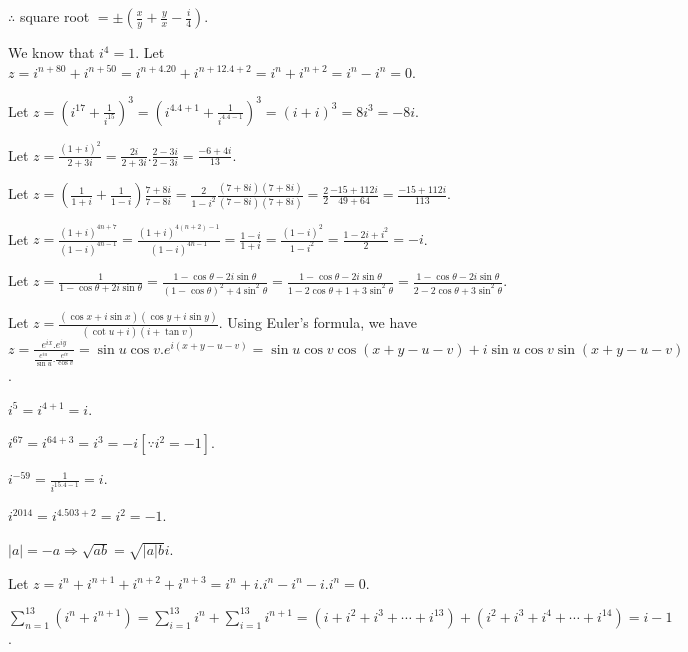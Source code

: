   $\therefore$ square root $=\pm\left(\frac{x}{y} + \frac{y}{x} - \frac{i}{4}\right)$.
\item We know that $i^4 = 1$. Let $z = i^{n + 80} + i^{n + 50} = i^{n + 4.20} + i^{n + 12.4 + 2} = i^n +
  i^{n + 2} = i^n - i^n = 0$.
\item Let $z = \left(i^{17} + \frac{1}{i^{15}}\right)^3 = \left(i^{4.4 + 1} + \frac{1}{i^{4.4 - 1}}\right)^3
  = (i + i)^3 = 8i^3 = -8i$.
\item Let $z = \frac{(1 + i)^2}{2 + 3i} = \frac{2i}{2 + 3i}.\frac{2 - 3i}{2 - 3i} = \frac{-6 + 4i}{13}$.
\item Let $z = \left(\frac{1}{1 + i} + \frac{1}{1 - i}\right)\frac{7 + 8i}{7 - 8i} = \frac{2}{1 - i^2}\frac{(7 +
  8i)(7 + 8i)}{(7 - 8i)(7 + 8i)} = \frac{2}{2}\frac{-15 + 112i}{49 + 64} = \frac{-15 + 112i}{113}$.
\item Let $z = \frac{(1 + i)^{4n + 7}}{(1 - i)^{4n - 1}} = \frac{(1 + i)^{4(n + 2) - 1}}{(1 - i)^{4n - 1}} =
  \frac{1 - i}{1 + i} = \frac{(1 - i)^2}{1 - i^2} = \frac{1 - 2i + i^2}{2} = -i$.
\item Let $z = \frac{1}{1 - \cos\theta + 2i\sin\theta} = \frac{1 - \cos\theta - 2i\sin\theta}{(1 -
  \cos\theta)^2 + 4\sin^2\theta} = \frac{1 - \cos\theta - 2i\sin\theta}{1 - 2\cos\theta + 1 +
  3\sin^2\theta} = \frac{1 - \cos\theta - 2i\sin\theta}{2 - 2\cos\theta + 3\sin^2\theta}$.
\item Let $z = \frac{(\cos x + i\sin x)(\cos y + i\sin y)}{(\cot u + i)(i + \tan v)}$. Using Euler's
  formula, we have $z = \frac{e^{ix}.e^{iy}}{\frac{e^{iu}}{\sin u}.\frac{e^{iv}}{\cos v}} = \sin u\cos
  v.e^{i(x + y - u - v)} = \sin u\cos v\cos(x + y - u - v) + i\sin u\cos v\sin(x + y - u - v)$.
\item \startitemize[i]\item $i^5 = i^{4 + 1} = i$.
\item $i^{67} = i^{64 + 3} = i^3 = -i[\because i^2 = -1]$.
\item $i^{-59} = \frac{1}{i^{15.4 - 1}} = i$.
\item $i^{2014} = i^{4.503 + 2} = i^2 = -1$.
\stopitemize
\item $|a| = -a \Rightarrow \sqrt{ab} = \sqrt{|a|b}i$.
\item Let $z = i^n + i^{n + 1} + i^{n + 2} + i^{n + 3} = i^n + i.i^n - i^n - i.i^n = 0$.
\item $\displaystyle\sum_{n = 1}^{13}(i^n + i^{n + 1}) = \sum_{i=1}^{13}i^n + \sum_{i=1}^{13}i^{n + 1} = (i
  + i^2 + i^3 + \cdots + i^{13}) + (i^2 + i^3 + i^4 + \cdots + i^{14}) = i - 1$.

